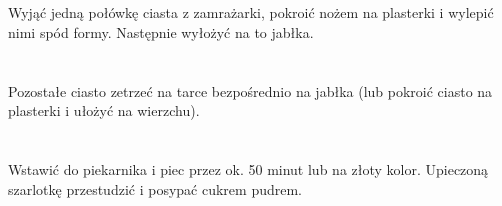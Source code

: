 \documentclass[12pt, letterpaper, titlepage]{article}
\begin{document}
\section{}
Wyjąć jedną połówkę ciasta z zamrażarki, pokroić nożem na plasterki i wylepić nimi spód formy. Następnie wyłożyć na to jabłka.
\section{}
Pozostałe ciasto zetrzeć na tarce bezpośrednio na jabłka (lub pokroić ciasto na plasterki i ułożyć na wierzchu).
\section{}
Wstawić do piekarnika i piec przez ok. 50 minut lub na złoty kolor. Upieczoną szarlotkę przestudzić i posypać cukrem pudrem.
\end{document}

